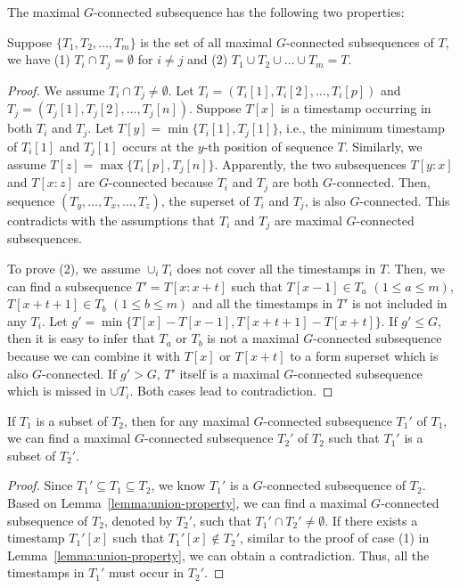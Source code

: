 The maximal $G$-connected subsequence has the following two properties:
\begin{lemma}\label{lemma:union-property}
Suppose $\{T_1,T_2,\ldots,T_m\}$ is the set of all maximal $G$-connected subsequences of $T$, we have (1) $T_i\cap T_j=\emptyset$ for $i\neq j$ and (2) $T_1\cup T_2\cup\ldots\cup T_m=T$.
\end{lemma}
\begin{proof}
We assume $T_i\cap T_j\neq \emptyset$. Let $T_i=(T_i[1], T_i[2],\ldots,T_i[p])$ and $T_j= (T_j[1], T_j[2],\ldots,T_j[n])$. Suppose $T[x]$ is a timestamp occurring in both $T_i$ and $T_j$. Let $T[y]=\min\{T_i[1],T_j[1]\}$, i.e., the minimum timestamp of $T_i[1]$ and $T_j[1]$ occurs at the $y$-th position of sequence $T$. Similarly, we assume $T[z]=\max\{T_i[p], T_j[n]\}$. Apparently, the two subsequences $T[y:x]$ and $T[x:z]$ are $G$-connected because $T_i$ and $T_j$ are both $G$-connected. Then, sequence $(T_y,\ldots,T_x,\ldots,T_z)$, the superset of $T_i$ and $T_j$, is also $G$-connected. This contradicts with the assumptions that $T_i$ and $T_j$ are maximal $G$-connected subsequences. 




To prove (2), we assume $\cup_i T_i$ does not cover all the timestamps in $T$. Then, we can find a subsequence $T'=T[x:x+t]$ such that $T[x-1]\in T_a$ $(1\leq a\leq m)$, $T[x+t+1]\in T_b$ $(1\leq b\leq m)$ and all the timestamps in $T'$ is not included in any $T_i$. Let $g'=\min\{T[x]-T[x-1], T[x+t+1]-T[x+t]\}$. If $g'\leq G$, then it is easy to infer that $T_a$ or $T_b$ is not a maximal $G$-connected subsequence because we can combine it with $T[x]$ or $T[x+t]$  to a form superset which is also $G$-connected. If $g'>G$, $T'$ itself is a maximal $G$-connected subsequence which is missed in $\cup T_i$. Both cases lead to contradiction.
\end{proof}




\begin{lemma}\label{lemma:subset-property}
If $T_1$ is a subset of $T_2$, then for any maximal $G$-connected subsequence $T_1'$ of $T_1$, we can find a maximal $G$-connected subsequence $T_2'$ of $T_2$ such that $T_1'$ is a subset of $T_2'$.
\end{lemma}
\begin{proof}
Since $T_1' \subseteq T_1 \subseteq T_2 $, we know $T_1'$ is a $G$-connected subsequence of $T_2$. Based on Lemma~\ref{lemma:union-property}, we can find a maximal $G$-connected subsequence of $T_2$, denoted by $T_2'$, such that $T_1'\cap T_2'\neq \emptyset$. If there exists a timestamp $T_1'[x]$ such that $T_1'[x]\notin T_2'$, similar to the proof of case (1) in Lemma~\ref{lemma:union-property}, we can obtain a contradiction. Thus, all the timestamps in $T_1'$ must occur in $T_2'$.
\end{proof}

